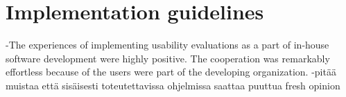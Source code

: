 \documentclass[12pt,a4paper,oneside,pdftex]{report}
\begin{document}
















\section{Implementation guidelines}
\label{sec:implementationguidelines}

-The experiences of implementing usability evaluations as a part of in-house software development were highly positive. The cooperation was remarkably effortless because of the users were part of the developing organization.  
-pitää muistaa että sisäisesti toteutettavissa ohjelmissa saattaa puuttua fresh opinion
\end{document}
